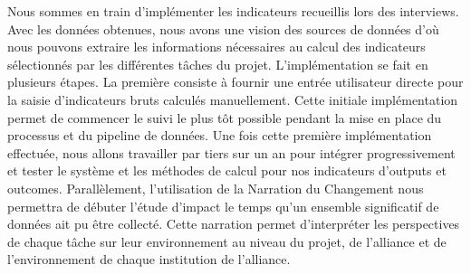 Nous sommes en train d'implémenter les indicateurs recueillis lors des interviews. Avec les données obtenues, nous avons  une vision des sources de données d'où nous pouvons extraire les informations nécessaires au calcul des indicateurs sélectionnés par les différentes tâches du projet. 
L'implémentation se fait en plusieurs étapes. La première consiste à fournir une entrée utilisateur directe pour la saisie d'indicateurs bruts calculés manuellement. Cette initiale implémentation permet de commencer le suivi le plus tôt possible pendant la mise en place du processus et du pipeline de données. 
Une fois cette première implémentation effectuée, nous allons travailler par tiers sur un an pour intégrer progressivement et tester le système et les méthodes de calcul pour nos indicateurs d'outputs et outcomes. 
Parallèlement, l'utilisation de la Narration du Changement nous permettra de débuter l'étude d'impact le temps qu'un ensemble significatif de données ait pu être collecté. Cette narration permet d'interpréter les perspectives de chaque tâche sur leur environnement au niveau du projet, de l'alliance et de l'environnement de chaque institution de l'alliance.